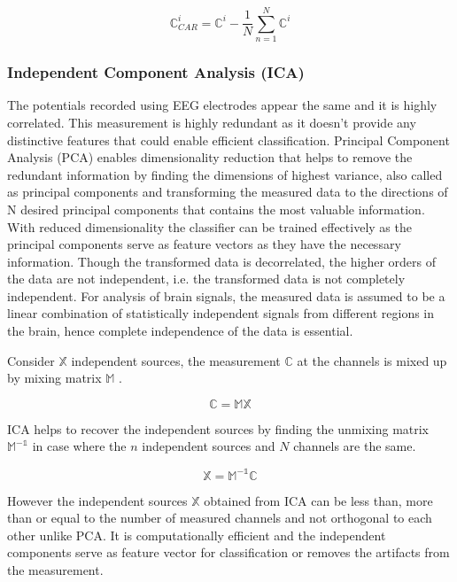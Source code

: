 \begin{equation} \label{eq:car_eeg}
    \mathbb{C}^{i}_{CAR} =  \mathbb{C}^{i} - \frac{1}{N} \sum_{n = 1}^{N} \mathbb{C}^{i}
\end{equation}

\subsubsection{Independent Component Analysis (ICA)}
The potentials recorded using EEG electrodes appear the same and it is highly correlated. This measurement is highly redundant as it doesn't provide any distinctive features that could enable efficient classification. Principal Component Analysis (PCA)  enables dimensionality reduction that helps to remove the redundant information by finding the dimensions of highest variance, also called as principal components and transforming the measured data to the directions of N desired principal components that contains the most valuable information. With reduced dimensionality the classifier can be trained effectively as the principal components serve as feature vectors as they have the necessary information. Though the transformed data is decorrelated, the higher orders of the data are not independent, i.e. the transformed data is not completely independent. For analysis of brain signals, the measured data is assumed to be a linear combination of statistically independent signals from different regions in the brain, hence complete independence of the data is essential.

Consider $\mathbb{X}$ independent sources, the measurement $\mathbb{C}$ at the channels is mixed up by mixing matrix $\mathbb{M}$ .

\begin{equation} \label{eq:mixed_ica}
    \mathbb{C} = \mathbb{MX} 
\end{equation}

ICA helps to recover the independent sources by finding the unmixing matrix  $\mathbb{M^{-1}}$  in case where the $n$ independent sources and $N$ channels are the same.

\begin{equation} \label{eq:unmixed_ica}
    \mathbb{X} = \mathbb{M^{-1}C}
\end{equation}

However the independent sources $\mathbb{X}$ obtained from ICA can be less than, more than or equal to the number of measured channels and not orthogonal to each other unlike PCA. It is computationally efficient and the independent components serve as feature vector for classification or removes the artifacts from the measurement.

